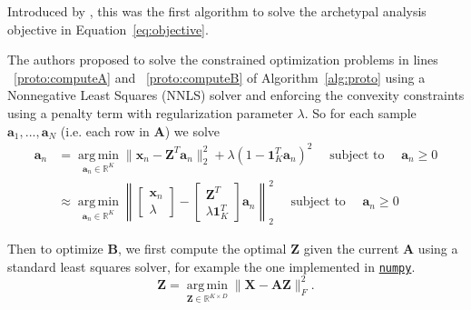 \documentclass{article}
\DeclareMathOperator*{\argmin}{arg\,min}
\begin{document}
Introduced by \textcite{cutlerArchetypalAnalysis1994}, this was the first algorithm to solve the archetypal analysis objective in Equation~\eqref{eq:objective}.

The authors proposed to solve the constrained optimization problems in lines ~\ref{proto:computeA} and ~\ref{proto:computeB} of Algorithm~\ref{alg:proto} using a Nonnegative Least Squares (NNLS) solver and enforcing the convexity constraints using a penalty term with regularization parameter $\lambda$. So for each sample $\mathbf{a}_1, ..., \mathbf{a}_N$ (i.e. each row in $\mathbf{A}$) we solve
\begin{equation}
    \label{eq:rnnls_update_A}
    \begin{aligned}
        \mathbf{a}_n
        &= \underset{\mathbf{a}_n \in \mathbb{R}^K}{\argmin} \|\mathbf{x}_n - \mathbf{Z}^T \mathbf{a}_n\|_2^2 + \lambda \left(1 - \mathbf{1}_K^T \mathbf{a}_n \right)^2 \quad \text{ subject to } \quad \mathbf{a}_n \geq 0 \\
        &\approx \underset{\mathbf{a}_n \in \mathbb{R}^K}{\argmin} \left\| \begin{bmatrix} \mathbf{x}_n \\ \lambda \end{bmatrix} -  \begin{bmatrix} \mathbf{Z}^T \\ \lambda \mathbf{1}_K^T \end{bmatrix} \mathbf{a}_n \right\|_2^2 \quad \text{ subject to } \quad \mathbf{a}_n \geq 0
    \end{aligned}
\end{equation}

Then to optimize $\mathbf{B}$, we first compute the optimal $\mathbf{Z}$ given the current $\mathbf{A}$ using a standard least squares solver, for example the one implemented in \href{https://numpy.org/doc/stable/reference/generated/numpy.linalg.lstsq.html}{\texttt{numpy}}.
\begin{equation}
\mathbf{Z} = \underset{\mathbf{Z} \in \mathbb{R}^{K \times D}}{\argmin} \| \mathbf{X} - \mathbf{A} \mathbf{Z}\|_F^2.
\end{equation}
\end{document}
